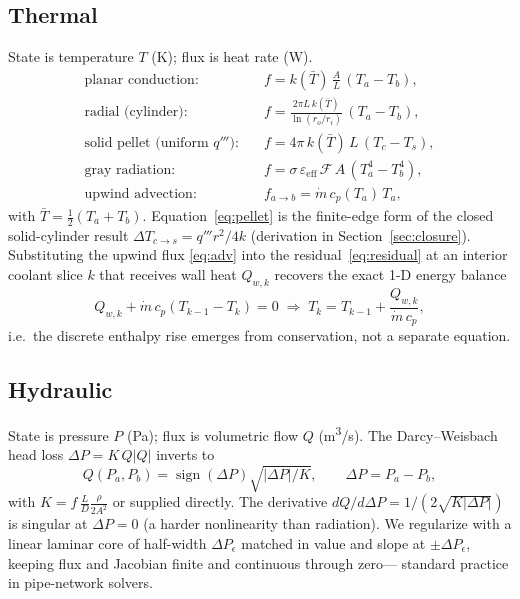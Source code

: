 \documentclass[11pt]{article}
\begin{document}
\subsection{Thermal}
State is temperature $T$ (\si{K}); flux is heat rate (\si{W}).
\begin{align}
\text{planar conduction:}\quad & f = k(\bar T)\,\tfrac{A}{L}\,(T_a-T_b),\\
\text{radial (cylinder):}\quad & f = \frac{2\pi L\,k(\bar T)}{\ln(r_o/r_i)}\,(T_a-T_b),\\
\text{solid pellet (uniform $q'''$):}\quad & f = 4\pi\,k(\bar T)\,L\,(T_c-T_s),
\label{eq:pellet}\\
\text{gray radiation:}\quad & f = \sigma\,\varepsilon_\text{eff}\,\mathcal{F}\,A\,(T_a^4-T_b^4),\\
\text{upwind advection:}\quad & f_{a\to b} = \dot m\,c_p(T_a)\,T_a,
\label{eq:adv}
\end{align}
with $\bar T = \tfrac12(T_a+T_b)$. Equation~\eqref{eq:pellet} is the
finite-edge form of the closed solid-cylinder result $\Delta T_{c\to s}=q'''r^2/4k$
(derivation in Section~\ref{sec:closure}). Substituting the upwind flux
\eqref{eq:adv} into the residual~\eqref{eq:residual} at an interior coolant slice
$k$ that receives wall heat $Q_{w,k}$ recovers the exact 1-D energy balance
\begin{equation}
Q_{w,k} + \dot m\,c_p(T_{k-1}-T_k) = 0
\;\Longrightarrow\;
T_k = T_{k-1} + \frac{Q_{w,k}}{\dot m\,c_p},
\end{equation}
i.e.\ the discrete enthalpy rise emerges from conservation, not a separate
equation.

\subsection{Hydraulic}
State is pressure $P$ (\si{Pa}); flux is volumetric flow $Q$ (\si{m^3/s}). The
Darcy--Weisbach head loss $\Delta P = K\,Q|Q|$ inverts to
\begin{equation}
Q(P_a,P_b)=\operatorname{sign}(\Delta P)\sqrt{|\Delta P|/K},\qquad \Delta P=P_a-P_b,
\label{eq:darcy}
\end{equation}
with $K=f\,\tfrac{L}{D}\tfrac{\rho}{2A^2}$ or supplied directly. The derivative
$dQ/d\Delta P = 1/(2\sqrt{K|\Delta P|})$ is singular at $\Delta P=0$ (a harder
nonlinearity than radiation). We regularize with a linear laminar core of
half-width $\Delta P_\epsilon$ matched in value and slope at $\pm\Delta
P_\epsilon$, keeping flux and Jacobian finite and continuous through zero---
standard practice in pipe-network solvers.
\end{document}
